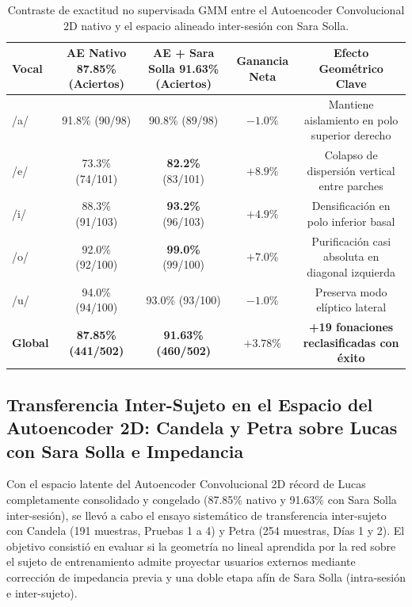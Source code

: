 \documentclass[11pt,a4paper]{article}
\begin{document}
\begin{table}[H]
\centering
\small
\begin{tabular}{lcccc}
\toprule
\textbf{Vocal} & \textbf{AE Nativo 87.85\% (Aciertos)} & \textbf{AE + Sara Solla 91.63\% (Aciertos)} & \textbf{Ganancia Neta} & \textbf{Efecto Geométrico Clave} \\
\midrule
/a/ & 91.8\% (90/98)  & 90.8\% (89/98)  & $-1.0\%$ & Mantiene aislamiento en polo superior derecho \\
/e/ & 73.3\% (74/101) & \textbf{82.2\%} (83/101) & $\mathbf{+8.9\%}$ & Colapso de dispersión vertical entre parches \\
/i/ & 88.3\% (91/103) & \textbf{93.2\%} (96/103) & $\mathbf{+4.9\%}$ & Densificación en polo inferior basal \\
/o/ & 92.0\% (92/100) & \textbf{99.0\%} (99/100) & $\mathbf{+7.0\%}$ & Purificación casi absoluta en diagonal izquierda \\
/u/ & 94.0\% (94/100) & 93.0\% (93/100) & $-1.0\%$ & Preserva modo elíptico lateral \\
\midrule
\textbf{Global} & \textbf{87.85\% (441/502)} & \textbf{91.63\% (460/502)} & $\mathbf{+3.78\%}$ & \textbf{+19 fonaciones reclasificadas con éxito} \\
\bottomrule
\end{tabular}
\caption{Contraste de exactitud no supervisada GMM entre el Autoencoder Convolucional 2D nativo y el espacio alineado inter-sesión con Sara Solla.}
\label{tab:desglose_ae_nativo_vs_solla}
\end{table}

\subsection{Transferencia Inter-Sujeto en el Espacio del Autoencoder 2D: Candela y Petra sobre Lucas con Sara Solla e Impedancia}
\label{subsec:transferencia_ae2d_tri_sujeto_sara_solla}

Con el espacio latente del Autoencoder Convolucional 2D récord de Lucas completamente consolidado y congelado (87.85\% nativo y 91.63\% con Sara Solla inter-sesión), se llevó a cabo el ensayo sistemático de transferencia inter-sujeto con Candela (191 muestras, Pruebas 1 a 4) y Petra (254 muestras, Días 1 y 2). El objetivo consistió en evaluar si la geometría no lineal aprendida por la red sobre el sujeto de entrenamiento admite proyectar usuarios externos mediante corrección de impedancia previa y una doble etapa afín de Sara Solla (intra-sesión e inter-sujeto).
\end{document}
